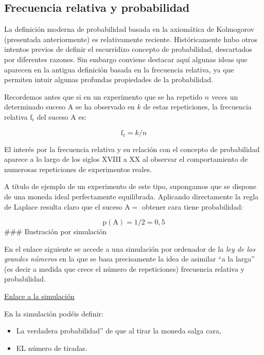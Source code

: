 \documentclass[
]{article}
\providecommand{\tightlist}{%
  \setlength{\itemsep}{0pt}\setlength{\parskip}{0pt}}
\begin{document}
\subsection{Frecuencia relativa y probabilidad}\label{frecuencia-relativa-y-probabilidad}

La definición moderna de probabilidad basada en la axiomática de
Kolmogorov (presentada anteriormente) es relativamente reciente.
Históricamente hubo otros intentos previos de definir el escurridizo
concepto de probabilidad, descartados por diferentes razones. Sin
embargo conviene destacar aquí algunas ideas que aparecen en la antigua
definición basada en la frecuencia relativa, ya que permiten intuir
algunas profundas propiedades de la probabilidad.

Recordemos antes que si en un experimento que se ha repetido \(n\) veces
un determinado suceso A se ha observado en \(k\) de estas repeticiones, la
frecuencia relativa \(\mathrm{f}_{\mathrm{r}}\) del suceso A es:

\[
\mathrm{f}_{\mathrm{r}}=k / n
\]

El interés por la frecuencia relativa y su relación con el concepto de
probabilidad aparece a lo largo de los siglos XVIII a XX al observar el
comportamiento de numerosas repeticiones de experimentos reales.

A título de ejemplo de un experimento de este tipo, supongamos que se
dispone de una moneda ideal perfectamente equilibrada. Aplicando
directamente la regla de Laplace resulta claro que el suceso
\(\mathrm{A}=\) obtener cara tiene probabilidad:

\[
\mathrm{p}(\mathrm{A})=1 / 2=0,5
\]
\#\#\# Ilustración por simulación

En el enlace siguiente se accede a una simulación por ordenador de la \emph{ley de los grandes números} en la que se basa precisamente la idea de asimilar ``a la larga'' (es decir a medida que crece el número de repeticiones) frecuencia relativa y probabilidad.

\href{https://www.grbio.eu/statmedia/Statmedia_1/}{Enlace a la simulación}

En la simulación podéis definir:

\begin{itemize}
\tightlist
\item
  La verdadera probabilidad'' de que al tirar la moneda salga cara,
\item
  EL número de tiradas.
\end{itemize}
\end{document}
